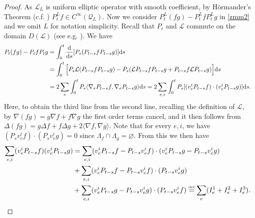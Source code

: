 \documentclass[11pt,UTF-8,reqno]{amsart}
\numberwithin{equation}{section}
\def\<{{\langle}}
\def\>{{\rangle}}
\def\dif{{\mathord{{\rm d}}}}
\newcommand{\eqdef}{\stackrel{\mbox{\tiny def}}{=}}
\def\cL{{\mathcal L}}
\def\cQ{{\mathcal Q}}
\let\emptyset\varnothing
\def\<{{\langle}}
\def\>{{\rangle}}
\def\dif{{\mathord{{\rm d}}}}
\def\<{\langle} \def\>{\rangle}
\begin{document}
\begin{proof}
	As $\cL_L$ is uniform elliptic operator with smooth coefficient, by H\"ormander's Theorem (c.f. \cite[Theorem~2.3.3]{MR2200233}) $P_t^Lf\in C^\infty(\cQ_L)$.
	Now we consider $P_t^L(fg)-P_t^Lf P_t^Lg$ in \eqref{zmm2} and we omit $L$ for notation simplicity.
	Recall that $P_t $ and $\cL $ commute on the domain $ D(\cL)$ (see e.g. \cite[Chap. I Exercise 1.9]{MaRockner}).
We have
	\begin{align*}
		P_t(fg)-P_tf P_tg
		&=\int_0^t \frac{\dif}{\dif s}[P_s(P_{t-s }f P_{t-s}g)]\dif s
		\\
		&=\int_0^t \Big [P_s\cL(P_{t-s }f P_{t-s}g)-P_s(\cL P_{t-s}f P_{t-s}g+ P_{t-s}f \cL P_{t-s}g) \Big]\dif s
		\\
		&=2\sum_{e}\int_0^tP_s\<\nabla_eP_{t-s }f, \nabla_eP_{t-s}g\>\dif s
		=2\sum_{e,i}\int_0^tP_s[(v_e^iP_{t-s }f)\cdot (v_e^iP_{t-s}g)]\dif s.
	\end{align*}
Here, to obtain the third line from the second line,  recalling the definition of $\cL$,
by $\nabla(fg)=g\nabla f +f\nabla g$ the first order terms cancel, and it then follows from  $\Delta(fg)=g\Delta f+f\Delta g+2\<\nabla f,\nabla g\>$. 
	Note that for every $e, i $, we have $(P_sv_e^i f)\cdot (P_sv_e^i g)=0$ since $\Lambda_f\cap \Lambda_g=\emptyset$.
	From this we then have
	\begin{align*}
		\sum_{e,i}(v_e^iP_{t-s }f)( v_e^iP_{t-s}g)
		&= \sum_{e,i}(v_e^iP_{t-s }f-P_{t-s}v_e^i f )\cdot( v_e^iP_{t-s}g-P_{t-s}v_e^i g)
		\\
		&+\sum_{e,i}(v_e^iP_{t-s }f-P_{t-s}v_e^i f)\cdot (P_{t-s}v_e^i g)
		\\
		&+\sum_{e,i}(v_e^iP_{t-s }g-P_{t-s}v_e^i g)\cdot(P_{t-s}v_e^i f)
		 \eqdef \sum_{e}(I_e^1+I^2_e+I^3_e).
	\end{align*}
	

\end{proof}
\end{document}
